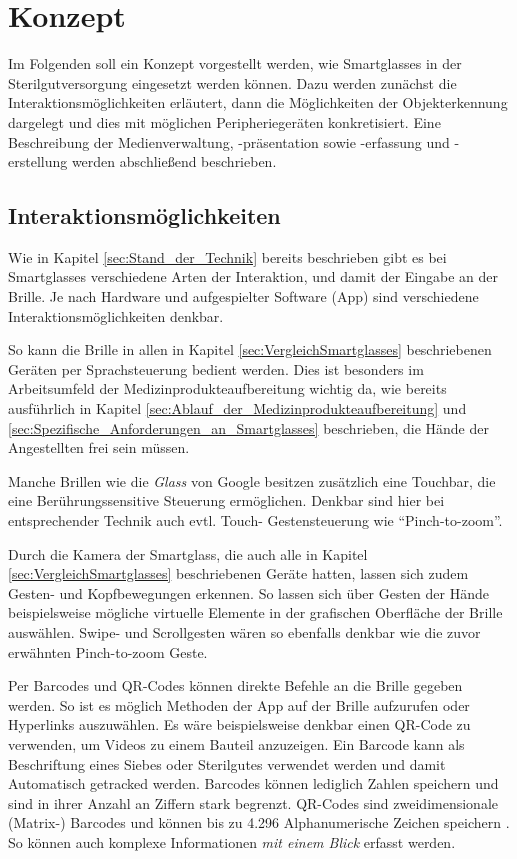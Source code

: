 %
%
%
%
%
%
\chapter{Konzept}
\label{ch:Konzept}
Im Folgenden soll ein Konzept vorgestellt werden, wie Smartglasses in der Sterilgutversorgung eingesetzt werden können. Dazu werden zunächst die Interaktionsmöglichkeiten erläutert, dann die Möglichkeiten der Objekterkennung dargelegt und dies mit möglichen Peripheriegeräten konkretisiert. Eine Beschreibung der Medienverwaltung, -präsentation sowie -erfassung und -erstellung werden abschließend beschrieben.
%
%
%
%
%
%
\section{Interaktionsmöglichkeiten}
\label{sec:Interaktionsmoeglichkeiten}
Wie in Kapitel \ref{sec:Stand_der_Technik} bereits beschrieben gibt es bei Smartglasses verschiedene Arten der Interaktion, und damit der Eingabe an der Brille. Je nach Hardware und aufgespielter Software (App) sind verschiedene Interaktionsmöglichkeiten denkbar. 

So kann die Brille in allen in Kapitel \ref{sec:VergleichSmartglasses} beschriebenen Geräten per Sprachsteuerung bedient werden. Dies ist besonders im Arbeitsumfeld der Medizinprodukteaufbereitung wichtig da, wie bereits ausführlich in Kapitel \ref{sec:Ablauf_der_Medizinprodukteaufbereitung} und \ref{sec:Spezifische_Anforderungen_an_Smartglasses} beschrieben, die Hände der Angestellten frei sein müssen.

Manche Brillen wie die \emph{Glass} von Google besitzen zusätzlich eine Touchbar, die eine Berührungssensitive Steuerung ermöglichen. Denkbar sind hier bei entsprechender Technik auch evtl. Touch- Gestensteuerung wie \enquote{Pinch-to-zoom}.

Durch die Kamera der Smartglass, die auch alle in Kapitel \ref{sec:VergleichSmartglasses} beschriebenen Geräte hatten, lassen sich zudem Gesten- und Kopfbewegungen erkennen. So lassen sich über Gesten der Hände beispielsweise mögliche virtuelle Elemente in der grafischen Oberfläche der Brille auswählen. Swipe- und Scrollgesten wären so ebenfalls denkbar wie die zuvor erwähnten Pinch-to-zoom Geste.

Per Barcodes und QR-Codes können direkte Befehle an die Brille gegeben werden. So ist es möglich Methoden der App auf der Brille aufzurufen oder Hyperlinks auszuwählen. Es wäre beispielsweise denkbar einen QR-Code zu verwenden, um Videos zu einem Bauteil anzuzeigen. Ein Barcode kann als Beschriftung eines Siebes oder Sterilgutes verwendet werden und damit Automatisch getracked werden. Barcodes können lediglich Zahlen speichern und sind in ihrer Anzahl an Ziffern stark begrenzt. QR-Codes sind zweidimensionale (Matrix-) Barcodes  und können bis zu 4.296 Alphanumerische Zeichen speichern \cite{INCORPORATED2018}. So können auch komplexe Informationen \emph{mit einem Blick} erfasst werden.

